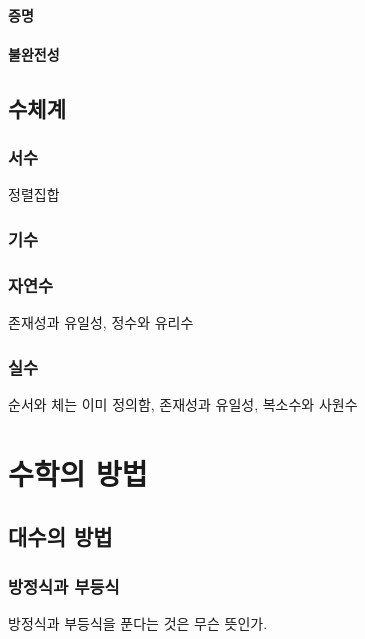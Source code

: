 \documentclass{../../large}
\begin{document}
\subsection*{증명}
\subsection*{불완전성}



\chapter{수체계}
\section{서수}
정렬집합
\section{기수}


\section{자연수}
존재성과 유일성,
정수와 유리수
\section{실수}
순서와 체는 이미 정의함,
존재성과 유일성,
복소수와 사원수








\part{수학의 방법}

\chapter{대수의 방법}




\section{방정식과 부등식}

방정식과 부등식을 푼다는 것은 무슨 뜻인가.
\end{document}
